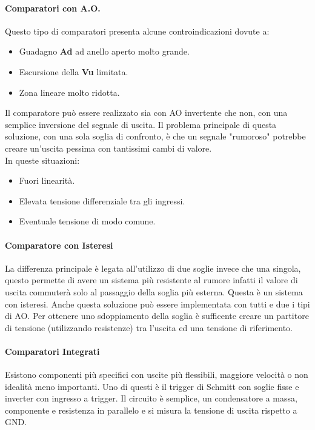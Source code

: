 \documentclass[12pt]{article}
\begin{document}
\paragraph{Comparatori con A.O.}
Questo tipo di comparatori presenta alcune controindicazioni dovute a:
\begin{itemize}
  \item Guadagno \textbf{Ad} ad anello aperto molto grande.
  \item Escursione della \textbf{Vu} limitata.
  \item Zona lineare molto ridotta.
\end{itemize}
Il comparatore può essere realizzato sia con AO invertente che non, con una semplice inversione del segnale di uscita. Il problema principale di questa soluzione, con una sola soglia di confronto, è che un segnale "rumoroso" potrebbe creare un'uscita pessima con tantissimi cambi di valore.\\
In queste situazioni:
\begin{itemize}
  \item Fuori linearità.
  \item Elevata tensione differenziale tra gli ingressi.
  \item Eventuale tensione di modo comune.
\end{itemize}

\paragraph{Comparatore con Isteresi}
La differenza principale è legata all'utilizzo di due soglie invece che una singola, questo permette di avere un sistema più resistente al rumore infatti il valore di uscita commuterà solo al passaggio della soglia più esterna. Questa è un sistema con isteresi. Anche questa soluzione può essere implementata con tutti e due i tipi di AO. Per ottenere uno sdoppiamento della soglia è sufficente creare un partitore di tensione (utilizzando resistenze) tra l'uscita ed una tensione di riferimento.

\paragraph{Comparatori Integrati}
Esistono componenti più specifici con uscite più flessibili, maggiore velocità o non idealità meno importanti. Uno di questi è il trigger di Schmitt con soglie fisse e inverter con ingresso a trigger. Il circuito è semplice, un condensatore a massa, componente e resistenza in parallelo e si misura la tensione di uscita rispetto a GND.
\end{document}
